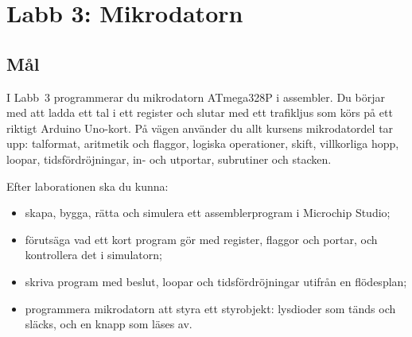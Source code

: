%

\chapter{Labb 3: Mikrodatorn}
\label{app:lab3}

\section{Mål}
\label{lab3:sec:goals}
I Labb~3 programmerar du mikrodatorn ATmega328P i assembler. Du börjar med att ladda ett tal i ett
register och slutar med ett trafikljus som körs på ett riktigt Arduino Uno-kort. På vägen använder
du allt kursens mikrodatordel tar upp: talformat, aritmetik och flaggor, logiska operationer, skift,
villkorliga hopp, loopar, tidsfördröjningar, in- och utportar, subrutiner och stacken.

Efter laborationen ska du kunna:
\begin{itemize}
  \item skapa, bygga, rätta och simulera ett assemblerprogram i Microchip Studio;
  \item förutsäga vad ett kort program gör med register, flaggor och portar, och kontrollera det i
    simulatorn;
  \item skriva program med beslut, loopar och tidsfördröjningar utifrån en flödesplan;
  \item programmera mikrodatorn att styra ett styrobjekt: lysdioder som tänds och släcks, och en
    knapp som läses av.
\end{itemize}

